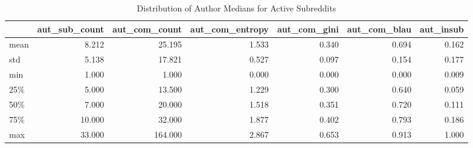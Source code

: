 \begin{table}
\centering
\begin{tabular}{lrrrrrr}
\toprule
{} &  aut\_sub\_count &  aut\_com\_count &  aut\_com\_entropy &  aut\_com\_gini &  aut\_com\_blau &  aut\_insub \\
\midrule
mean &          8.212 &         25.195 &            1.533 &         0.340 &         0.694 &      0.162 \\
std  &          5.138 &         17.821 &            0.527 &         0.097 &         0.154 &      0.177 \\
min  &          1.000 &          1.000 &            0.000 &         0.000 &         0.000 &      0.009 \\
25\%  &          5.000 &         13.500 &            1.229 &         0.300 &         0.640 &      0.059 \\
50\%  &          7.000 &         20.000 &            1.518 &         0.351 &         0.720 &      0.111 \\
75\%  &         10.000 &         32.000 &            1.877 &         0.402 &         0.793 &      0.186 \\
max  &         33.000 &        164.000 &            2.867 &         0.653 &         0.913 &      1.000 \\
\bottomrule
\end{tabular}
\caption{Distribution of Author Medians for Active Subreddits}
\label{table/author-medians:active}
\end{table}